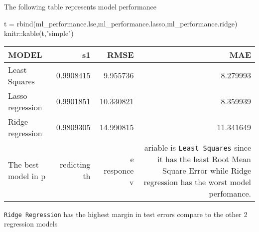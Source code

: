 \documentclass[
]{article}
\newenvironment{Shaded}{\begin{snugshade}}{\end{snugshade}}
\newcommand{\FunctionTok}[1]{\textcolor[rgb]{0.00,0.00,0.00}{#1}}
\newcommand{\NormalTok}[1]{#1}
\newcommand{\OtherTok}[1]{\textcolor[rgb]{0.56,0.35,0.01}{#1}}
\newcommand{\SpecialCharTok}[1]{\textcolor[rgb]{0.00,0.00,0.00}{#1}}
\newcommand{\StringTok}[1]{\textcolor[rgb]{0.31,0.60,0.02}{#1}}
\begin{document}
The following table represents model performance

\begin{Shaded}
\begin{Highlighting}[]
\NormalTok{t }\OtherTok{=} \FunctionTok{rbind}\NormalTok{(ml\_performance.lse,ml\_performance.lasso,ml\_performance.ridge)}
\NormalTok{knitr}\SpecialCharTok{::}\FunctionTok{kable}\NormalTok{(t,}\StringTok{"simple"}\NormalTok{)}
\end{Highlighting}
\end{Shaded}

\begin{longtable}[]{@{}lrrr@{}}
\toprule
MODEL & s1 & RMSE & MAE \\
\midrule
\endhead
Least Squares & 0.9908415 & 9.955736 & 8.279993 \\
Lasso regression & 0.9901851 & 10.330821 & 8.359939 \\
Ridge regression & 0.9809305 & 14.990815 & 11.341649 \\
The best model in p & redicting th & e responce v & ariable is
\texttt{Least\ Squares} since it has the least Root Mean Square Error
while Ridge regression has the worst model perfomance. \\
\bottomrule
\end{longtable}

\texttt{Ridge\ Regression} has the highest margin in test errors compare
to the other 2 regression models
\end{document}
